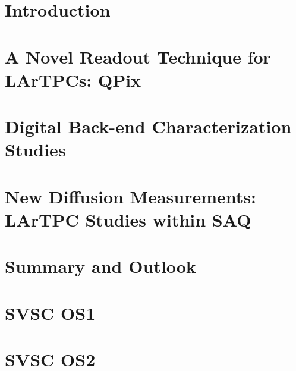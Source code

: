 \documentclass[12pt]{uh_thesis}
\begin{document}
\tableofcontents
\listoffigures
\listoftables
\printnomenclature

\mainmatter

\chapter{Introduction}
\label{chap:intro}



\chapter{A Novel Readout Technique for LArTPCs: QPix}
\label{chap:qpix}




\chapter{Digital Back-end Characterization Studies}
\label{chap:qdb}



\chapter{New Diffusion Measurements: LArTPC Studies within SAQ}
\label{chap:saq}



\chapter{Summary and Outlook}
\label{chap:summary}




\printbibliography[heading=bibintoc]

\appendix
\chapter{SVSC OS1}
\label{chap:OS1}

\chapter{SVSC OS2}
\label{chap:OS2}

\printindex
\end{document}
